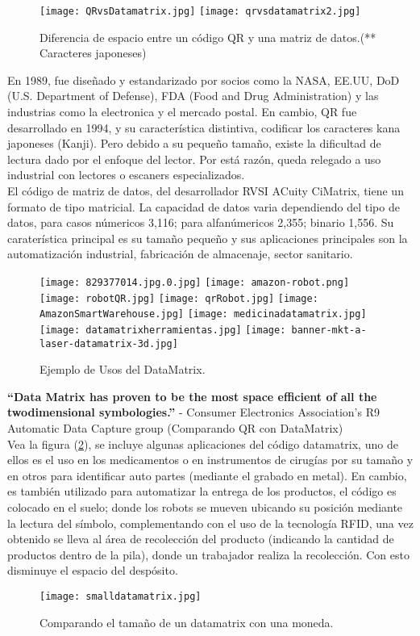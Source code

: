 \begin{figure} 
	\texttt{[image: QRvsDatamatrix.jpg]}
	\texttt{[image: qrvsdatamatrix2.jpg]}
	\caption{Diferencia de espacio entre un código QR y una matriz de datos.(** Caracteres japoneses)}
	\label{fig:datamatrixvsqr}
\end{figure}
En 1989, fue diseñado y estandarizado por socios como la NASA, EE.UU, DoD (U.S. Department of Defense), FDA (Food and Drug Administration) y las industrias como la electronica y el mercado postal. En cambio, QR fue desarrollado en 1994, y su característica distintiva, codificar los caracteres kana japoneses (Kanji).\cite{2006_Semacode_TECH_REPORT}
Pero debido a su pequeño tamaño, existe la dificultad de lectura dado por el enfoque del lector. Por está razón, queda relegado a uso industrial con lectores o escaners especializados. 
\\
El código de matriz de datos, del desarrollador RVSI ACuity CiMatrix, tiene un formato de tipo matricial. La capacidad de datos varia dependiendo del tipo de datos, para casos númericos 3,116; para alfanúmericos 2,355; binario 1,556. Su caraterística principal es su tamaño pequeño y sus aplicaciones principales son la automatización industrial, fabricación de almacenaje, sector sanitario. \cite{2012_DENSO}
\begin{figure} 
	\texttt{[image: 829377014.jpg.0.jpg]}
	\texttt{[image: amazon-robot.png]}
	\texttt{[image: robotQR.jpg]}
	\texttt{[image: qrRobot.jpg]}
	\texttt{[image: AmazonSmartWarehouse.jpg]}
	\texttt{[image: medicinadatamatrix.jpg]}
	\texttt{[image: datamatrixherramientas.jpg]}
	\texttt{[image: banner-mkt-a-laser-datamatrix-3d.jpg]}
	\caption{Ejemplo de Usos del DataMatrix.}
	\label{fig:datamatrixaplicaciones}
\end{figure}
\newpage
\textbf{“Data Matrix has proven to be the most space efficient of all the twodimensional symbologies.”}
- Consumer Electronics Association’s R9 Automatic Data Capture group (Comparando QR con DataMatrix)\cite{2006_Semacode_TECH_REPORT}
\\
Vea la figura (\ref{fig:datamatrixaplicaciones}), se incluye algunas aplicaciones del código datamatrix, uno de ellos es el uso en los medicamentos o en instrumentos de cirugías por su tamaño y en otros para identificar auto partes (mediante el grabado en metal). En cambio, es también utilizado para automatizar la entrega de los productos, el código es colocado en el suelo; donde los robots se mueven ubicando su posición mediante la lectura del símbolo, complementando con el uso de la tecnología RFID, una vez obtenido se lleva al área de recolección del producto (indicando la cantidad de productos dentro de la pila), donde un trabajador realiza la recolección. Con esto disminuye el espacio del despósito.
\begin{figure} 
	\centering
	\texttt{[image: smalldatamatrix.jpg]}
	\caption{Comparando el tamaño de un datamatrix con una moneda.}
	\label{fig:datamatrixmoneda}
\end{figure}

